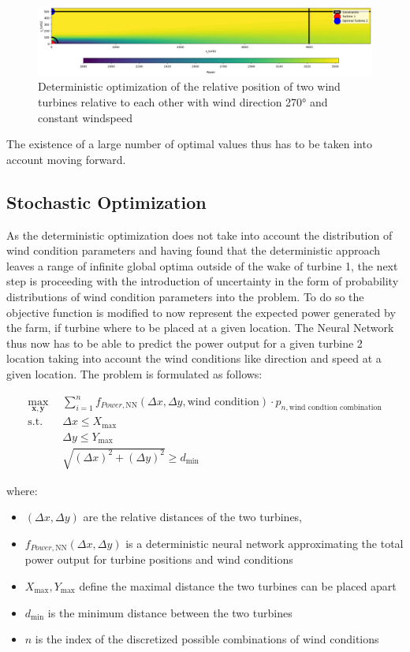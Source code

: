 \begin{figure}[h] 
	\centering
	\includegraphics[width=1\textwidth]{figures/optimization/opti_determ270.png} 
	\caption{Deterministic optimization of the relative position of two wind turbines relative to each other with wind direction 270° and constant windspeed}
	\label{fig:opti_determ270}
\end{figure}

The existence of a large number of optimal values thus has to be taken into account moving forward.


\subsection{Stochastic Optimization}

As the deterministic optimization does not take into account the distribution of wind condition parameters and having found that the deterministic approach leaves a range of infinite global optima outside of the wake of turbine 1, the next step is proceeding with the introduction of uncertainty in the form of probability distributions of wind condition parameters into the problem. To do so the objective function is modified to now represent the expected power generated by the farm, if turbine where to be placed at a given location. The Neural Network thus now has to be able to predict the power output for a given turbine 2 location taking into account the wind conditions like direction and speed at a given location. The problem is formulated as follows: 

\begin{align}
	\max_{\mathbf{x}, \mathbf{y}} &  \sum_{i=1}^{n} f_{Power,\text{NN}}(\Delta x, \Delta y, \text{wind condition})\cdot p_{n,\text{wind condtion combination}} \\
	\text{s.t.} \quad 
	&  \Delta x \leq X_{\max} \\
	&  \Delta y \leq Y_{\max} \\
	& \sqrt{(\Delta x)^2 + (\Delta y)^2} \geq d_{\min}
\end{align}

where:
\begin{itemize}
	\item \( (\Delta x, \Delta y) \) are the relative distances of the two turbines,
	\item \( f_{Power, \text{NN}}(\Delta x, \Delta y)\) is a deterministic neural network  approximating the total power output for turbine positions and wind conditions
	\item \(  X_{\max}, Y_{\max} \) define the maximal distance the two turbines can be placed apart
	\item \( d_{\min} \) is the minimum distance between the two turbines
	\item \( n \) is the index of the discretized possible combinations of wind conditions 
\end{itemize}

